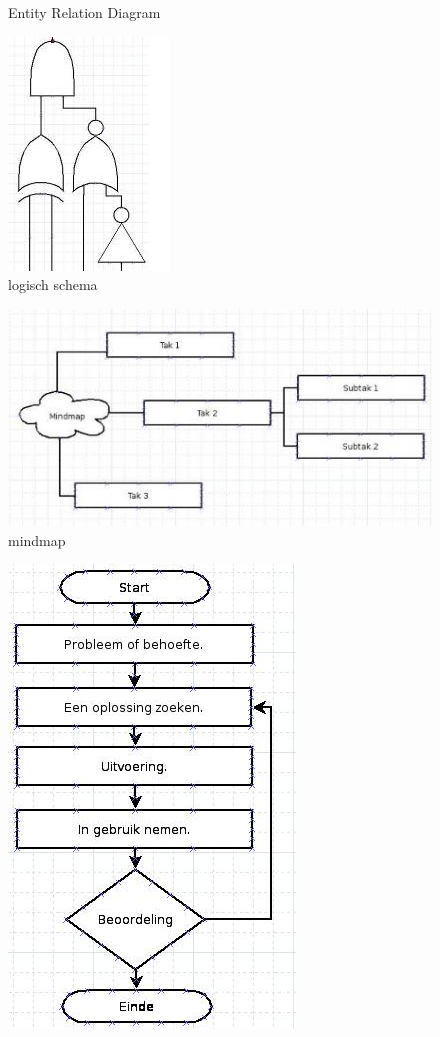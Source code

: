 \documentclass[12pt,a4paper]{report}
\begin{document}
\begin{flushleft}
\begin{figure}[H]
\centering 
\vspace{-10pt}
\caption{Entity Relation Diagram}
\end{figure}
\begin{figure}[H]
\includegraphics[scale=1]{images/voorbeeldschema_logisch.png}
\centering 
\vspace{-10pt}
\caption{logisch schema}
\end{figure}
\begin{figure}[H]
\includegraphics[scale=1]{images/voorbeeldschema_mindmap.png}
\centering 
\vspace{-10pt}
\caption{mindmap}
\end{figure}
\begin{figure}[H]
\includegraphics[scale=1]{images/voorbeeldschema_stroomdiagram.png}

\end{figure}
\end{flushleft}
\end{document}
